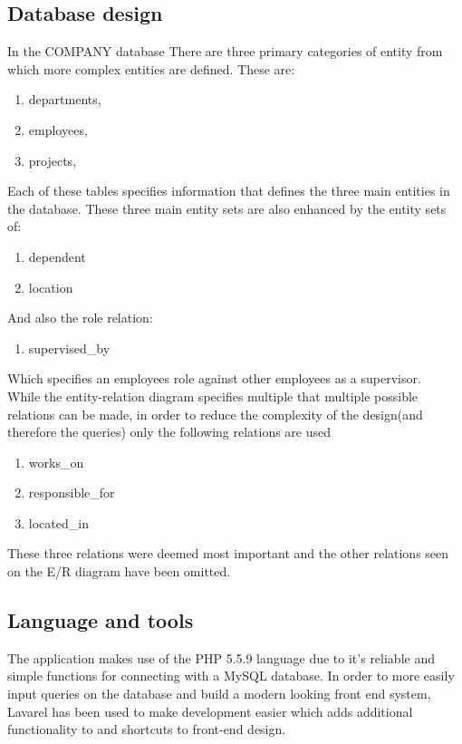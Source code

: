 \documentclass[11pt,letterpaper]{article}
\begin{document}
\subsection{Database design}
In the COMPANY database There are three primary categories of entity from which more complex entities are defined. These are:
\begin{enumerate}[]
	\item departments, 
	\item employees,
	\item projects,
\end{enumerate}
Each of these tables specifies information that defines the three main entities in the database. These three main entity sets are also enhanced by the entity sets of:
\begin{enumerate}[]
	\item dependent 
	\item location	
\end{enumerate}	
And also the role relation:
\begin{enumerate}[]	
	\item supervised\_by 	
\end{enumerate}
Which specifies an employees role against other employees as a supervisor.\\
While the entity-relation diagram specifies multiple that multiple possible relations can be made, in order to reduce the complexity of the design(and therefore the queries) only the following relations are used
\begin{enumerate}[]
	\item works\_on
	\item responsible\_for
	\item located\_in
\end{enumerate}
These three relations were deemed most important and the other relations seen on the E/R diagram have been omitted.

\subsection{Language and tools}
	The application makes use of the PHP 5.5.9 language due to it's reliable and simple functions for connecting with a MySQL database. In order to more easily input queries on the database and build a modern looking front end system, Lavarel has been used to make development easier which adds additional functionality to and shortcuts to front-end design.\\
\end{document}
